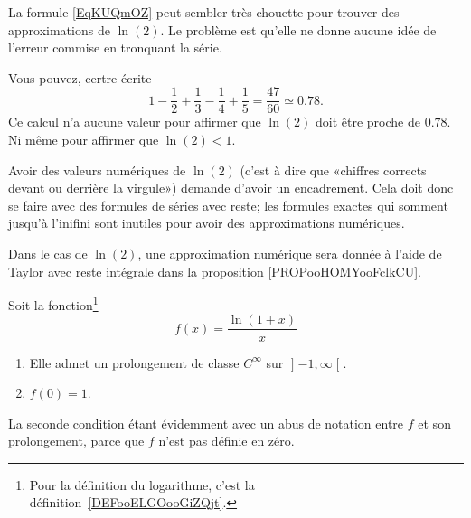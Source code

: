 \begin{normaltext}
    La formule \eqref{EqKUQmOZ} peut sembler très chouette pour trouver des approximations de \( \ln(2)\). Le problème est qu'elle ne donne aucune idée de l'erreur commise en tronquant la série.

    Vous pouvez, certre écrite
    \begin{equation}
        1-\frac{ 1 }{2}+\frac{1}{ 3 }-\frac{1}{ 4 }+\frac{1}{ 5 }=\frac{ 47 }{ 60 }\simeq 0.78.
    \end{equation}
    Ce calcul n'a aucune valeur pour affirmer que \( \ln(2)\) doit être proche de \( 0.78\). Ni même pour affirmer que \( \ln(2)<1\).

    Avoir des valeurs numériques de \( \ln(2)\) (c'est à dire que «chiffres corrects devant ou derrière la virgule») demande d'avoir un encadrement. Cela doit donc se faire avec des formules de séries avec reste; les formules exactes qui somment jusqu'à l'inifini sont inutiles pour avoir des approximations numériques.

    Dans le cas de \( \ln(2)\), une approximation numérique sera donnée à l'aide de Taylor avec reste intégrale dans la proposition \ref{PROPooHOMYooFclkCU}.
\end{normaltext}

\begin{lemma}
    Soit la fonction\footnote{Pour la définition du logarithme, c'est la définition~\ref{DEFooELGOooGiZQjt}.}
    \begin{equation}
        f(x)=\frac{ \ln(1+x) }{ x }
    \end{equation}
    \begin{enumerate}
        \item
        Elle admet un prolongement de classe \(  C^{\infty}\) sur \( \mathopen] -1 , \infty \mathclose[\).
        \item
            \( f(0)=1\).
    \end{enumerate}
    La seconde condition étant évidemment avec un abus de notation entre \( f\) et son prolongement, parce que \( f\) n'est pas définie en zéro.
\end{lemma}


